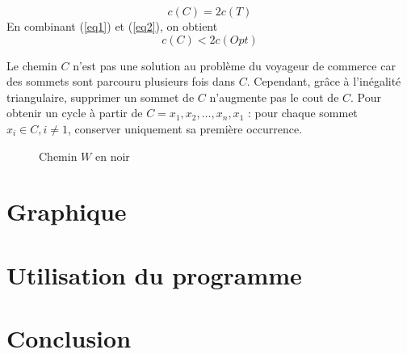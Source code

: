 \documentclass[a4paper,11pt]{article}
\begin{document}
\begin{equation}
c(C) = 2c(T)
\label{eq2}
\end{equation}
En combinant (\ref{eq1}) et (\ref{eq2}), on obtient
\begin{equation}
c(C) < 2c(Opt)
\label{eq2}
\end{equation}

Le chemin $C$ n'est pas une solution au problème du voyageur de commerce car des sommets sont parcouru plusieurs fois dans $C$. Cependant, grâce à l'inégalité triangulaire, supprimer un sommet de $C$ n’augmente pas le cout de $C$.
Pour obtenir un cycle à partir de $C = x_1, x_2, \ldots, x_n, x_1$ : 
pour chaque sommet $x_i \in C, i\neq1$, conserver uniquement sa première occurrence.

\begin{figure}[!h]
\centering
{}
\caption{Chemin $W$ en noir}
\end{figure}

\section{Graphique} %

\section{Utilisation du programme} %

\section{Conclusion} %
\end{document}

